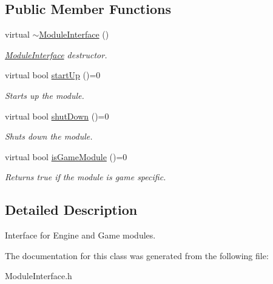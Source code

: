 \subsection*{Public Member Functions}
\begin{DoxyCompactItemize}
\item 
\mbox{\label{class_arcana_1_1_module_interface_a13db439f91f251753335e244d7199d10}} 
virtual \mbox{\hyperlink{class_arcana_1_1_module_interface_a13db439f91f251753335e244d7199d10}{$\sim$\+Module\+Interface}} ()
\begin{DoxyCompactList}\small\item\em \mbox{\hyperlink{class_arcana_1_1_module_interface}{Module\+Interface}} destructor. \end{DoxyCompactList}\item 
\mbox{\label{class_arcana_1_1_module_interface_abc52ffd77b2adcea7128816587dd09ad}} 
virtual bool \mbox{\hyperlink{class_arcana_1_1_module_interface_abc52ffd77b2adcea7128816587dd09ad}{start\+Up}} ()=0
\begin{DoxyCompactList}\small\item\em Starts up the module. \end{DoxyCompactList}\item 
\mbox{\label{class_arcana_1_1_module_interface_aca005760af4a5d2a32e5d3c79da61c4c}} 
virtual bool \mbox{\hyperlink{class_arcana_1_1_module_interface_aca005760af4a5d2a32e5d3c79da61c4c}{shut\+Down}} ()=0
\begin{DoxyCompactList}\small\item\em Shuts down the module. \end{DoxyCompactList}\item 
\mbox{\label{class_arcana_1_1_module_interface_a2836a901809149b08e25a36a8e939a44}} 
virtual bool \mbox{\hyperlink{class_arcana_1_1_module_interface_a2836a901809149b08e25a36a8e939a44}{is\+Game\+Module}} ()=0
\begin{DoxyCompactList}\small\item\em Returns true if the module is game specific. \end{DoxyCompactList}\end{DoxyCompactItemize}


\subsection{Detailed Description}
Interface for Engine and Game modules. 

The documentation for this class was generated from the following file\+:\begin{DoxyCompactItemize}
\item 
Module\+Interface.\+h\end{DoxyCompactItemize}

